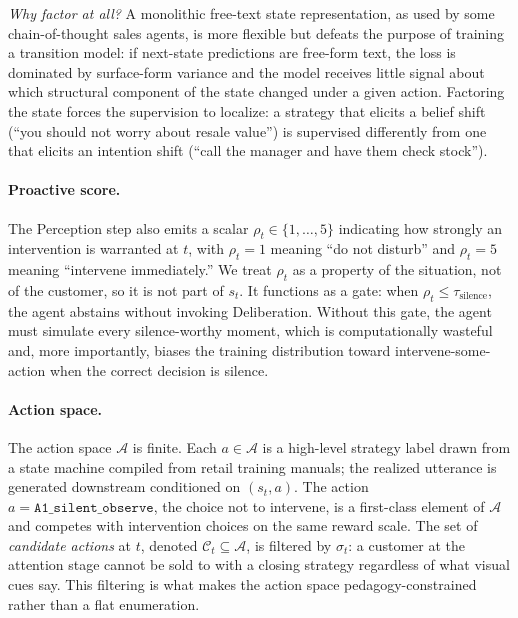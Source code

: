 \documentclass{article}
\begin{document}
\textit{Why factor at all?} A monolithic free-text state representation, as used by some chain-of-thought sales agents, is more flexible but defeats the purpose of training a transition model: if next-state predictions are free-form text, the loss is dominated by surface-form variance and the model receives little signal about which structural component of the state changed under a given action. Factoring the state forces the supervision to localize: a strategy that elicits a belief shift (``you should not worry about resale value'') is supervised differently from one that elicits an intention shift (``call the manager and have them check stock'').

\paragraph{Proactive score.}
The Perception step also emits a scalar $\rho_t \in \{1, \ldots, 5\}$ indicating how strongly an intervention is warranted at $t$, with $\rho_t = 1$ meaning ``do not disturb'' and $\rho_t = 5$ meaning ``intervene immediately.'' We treat $\rho_t$ as a property of the situation, not of the customer, so it is not part of $s_t$. It functions as a gate: when $\rho_t \le \tau_\text{silence}$, the agent abstains without invoking Deliberation. Without this gate, the agent must simulate every silence-worthy moment, which is computationally wasteful and, more importantly, biases the training distribution toward intervene-some-action when the correct decision is silence.

\paragraph{Action space.}
The action space $\mathcal{A}$ is finite. Each $a \in \mathcal{A}$ is a high-level strategy label drawn from a state machine compiled from retail training manuals; the realized utterance is generated downstream conditioned on $(s_t, a)$. The action $a = \texttt{A1\_silent\_observe}$, the choice not to intervene, is a first-class element of $\mathcal{A}$ and competes with intervention choices on the same reward scale. The set of \emph{candidate actions} at $t$, denoted $\mathcal{C}_t \subseteq \mathcal{A}$, is filtered by $\sigma_t$: a customer at the attention stage cannot be sold to with a closing strategy regardless of what visual cues say. This filtering is what makes the action space pedagogy-constrained rather than a flat enumeration.
\end{document}
